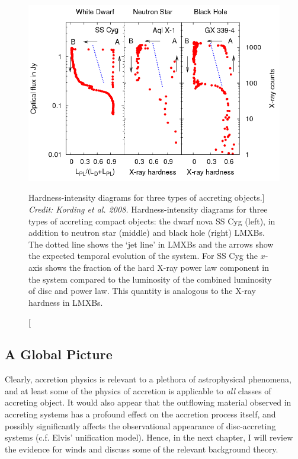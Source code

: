 \begin{figure}
\centering
\includegraphics[width=1.0\textwidth]{figures/01-intro/kording_hid.png}
\caption
[Hardness-intensity diagrams for three types of accreting objects.]
{
{\sl Credit: Kording et al. 2008.} 
Hardness-intensity diagrams for three types of accreting compact objects:
the dwarf nova SS Cyg (left), in addition to neutron star (middle) and black hole (right) 
LMXBs. The dotted line shows the `jet line' in LMXBs and the arrows show the 
expected temporal evolution of the system. For SS Cyg the $x$-axis shows the 
fraction of the hard X-ray power law component in the system compared to the 
luminosity of the combined luminosity of disc and power law. This quantity is
analogous to the X-ray hardness in LMXBs.
} 
\label{fig:kording_hid}
\end{figure}

\subsection{A Global Picture}

Clearly, accretion physics is relevant to a plethora of astrophysical phenomena, 
and at least some of the physics of accretion is applicable to {\em all} 
classes of accreting object. 
It would also appear that the outflowing material observed in accreting systems 
has a profound effect on the accretion process itself, and 
possibly significantly affects the observational 
appearance of disc-accreting systems (c.f. Elvis' unification model). 
Hence, in the next chapter, I will review the evidence for
winds and discuss some of the relevant background theory.

